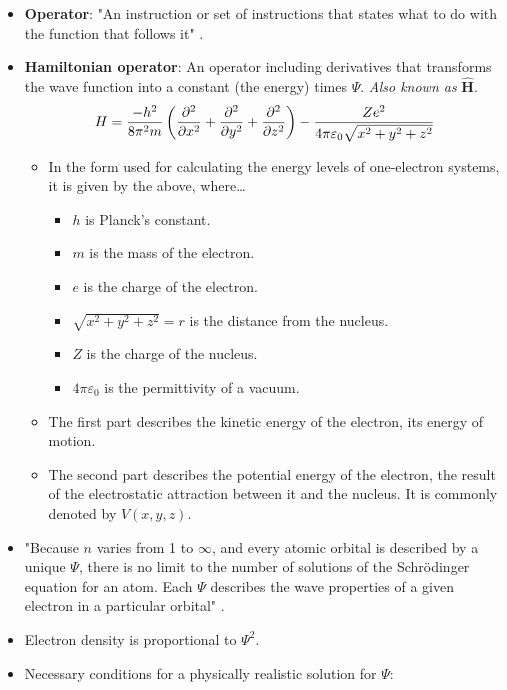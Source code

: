 \documentclass[../notes.tex]{subfiles}
\begin{document}
\begin{itemize}
    \item \textbf{Operator}: "An instruction or set of instructions that states what to do with the function that follows it" \parencite[14]{bib:MiesslerFischerTarr}.
    \item \textbf{Hamiltonian operator}: An operator including derivatives that transforms the wave function into a constant (the energy) times $\Psi$. \emph{Also known as} $\bm{\hat{H}}$.
    \begin{equation*}
        H = \frac{-h^2}{8\pi^2m}\left( \pdv[2]{x}+\pdv[2]{y}+\pdv[2]{z} \right)-\frac{Ze^2}{4\pi\varepsilon_0\sqrt{x^2+y^2+z^2}}
    \end{equation*}
    \begin{itemize}
        \item In the form used for calculating the energy levels of one-electron systems, it is given by the above, where\dots
        \begin{itemize}
            \item $h$ is Planck's constant.
            \item $m$ is the mass of the electron.
            \item $e$ is the charge of the electron.
            \item $\sqrt{x^2+y^2+z^2}=r$ is the distance from the nucleus.
            \item $Z$ is the charge of the nucleus.
            \item $4\pi\varepsilon_0$ is the permittivity of a vacuum.
        \end{itemize}
        \item The first part describes the kinetic energy of the electron, its energy of motion.
        \item The second part describes the potential energy of the electron, the result of the electrostatic attraction between it and the nucleus. It is commonly denoted by $V(x,y,z)$.
    \end{itemize}
    \item "Because $n$ varies from 1 to $\infty$, and every atomic orbital is described by a unique $\Psi$, there is no limit to the number of solutions of the Schr\"{o}dinger equation for an atom. Each $\Psi$ describes the wave properties of a given electron in a particular orbital" \parencite[15]{bib:MiesslerFischerTarr}.
    \item Electron density is proportional to $\Psi^2$.
    \item Necessary conditions for a physically realistic solution for $\Psi$:

\end{itemize}
\end{document}
